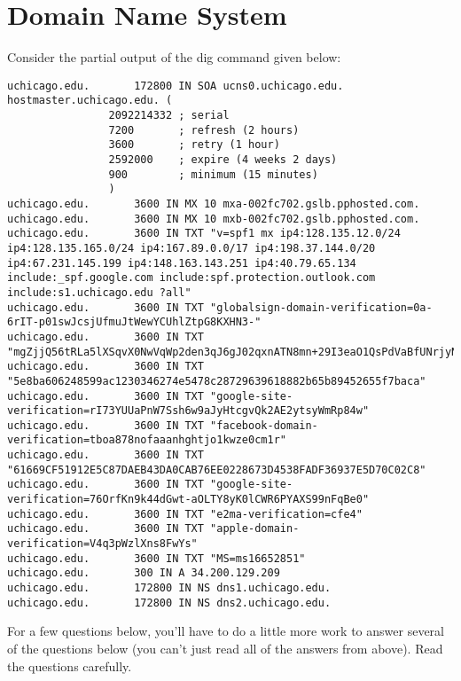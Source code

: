 \pagebreak
\section{Domain Name System}

 Consider the partial output of the dig command given below:
\begin{scriptsize}
\begin{verbatim}
uchicago.edu.		172800 IN SOA ucns0.uchicago.edu. hostmaster.uchicago.edu. (
				2092214332 ; serial
				7200       ; refresh (2 hours)
				3600       ; retry (1 hour)
				2592000    ; expire (4 weeks 2 days)
				900        ; minimum (15 minutes)
				)
uchicago.edu.		3600 IN	MX 10 mxa-002fc702.gslb.pphosted.com.
uchicago.edu.		3600 IN	MX 10 mxb-002fc702.gslb.pphosted.com.
uchicago.edu.		3600 IN	TXT "v=spf1 mx ip4:128.135.12.0/24 ip4:128.135.165.0/24 ip4:167.89.0.0/17 ip4:198.37.144.0/20 ip4:67.231.145.199 ip4:148.163.143.251 ip4:40.79.65.134 include:_spf.google.com include:spf.protection.outlook.com include:s1.uchicago.edu ?all"
uchicago.edu.		3600 IN	TXT "globalsign-domain-verification=0a-6rIT-p01swJcsjUfmuJtWewYCUhlZtpG8KXHN3-"
uchicago.edu.		3600 IN	TXT "mgZjjQ56tRLa5lXSqvX0NwVqWp2den3qJ6gJ02qxnATN8mn+29I3eaO1QsPdVaBfUNrjyNBg0Yr7l9HvgCFzkA=="
uchicago.edu.		3600 IN	TXT "5e8ba606248599ac1230346274e5478c28729639618882b65b89452655f7baca"
uchicago.edu.		3600 IN	TXT "google-site-verification=rI73YUUaPnW7Ssh6w9aJyHtcgvQk2AE2ytsyWmRp84w"
uchicago.edu.		3600 IN	TXT "facebook-domain-verification=tboa878nofaaanhghtjo1kwze0cm1r"
uchicago.edu.		3600 IN	TXT "61669CF51912E5C87DAEB43DA0CAB76EE0228673D4538FADF36937E5D70C02C8"
uchicago.edu.		3600 IN	TXT "google-site-verification=76OrfKn9k44dGwt-aOLTY8yK0lCWR6PYAXS99nFqBe0"
uchicago.edu.		3600 IN	TXT "e2ma-verification=cfe4"
uchicago.edu.		3600 IN	TXT "apple-domain-verification=V4q3pWzlXns8FwYs"
uchicago.edu.		3600 IN	TXT "MS=ms16652851"
uchicago.edu.		300 IN A 34.200.129.209
uchicago.edu.		172800 IN NS dns1.uchicago.edu.
uchicago.edu.		172800 IN NS dns2.uchicago.edu.
\end{verbatim}
\end{scriptsize}
For a few questions below, you'll have to do a little more work to answer several of the questions below
(you can't just read all of the answers from above).
Read the questions carefully.
